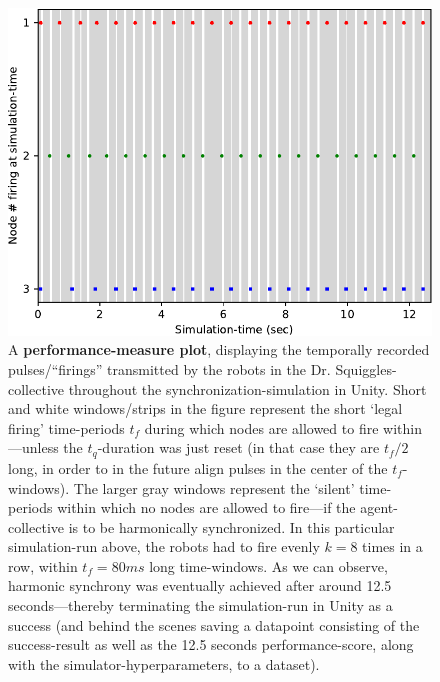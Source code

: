 \begin{figure}
	\centering
	\includegraphics[width=\linewidth]{Assets/Figures/Illustrations/IllustrativePerfMeasurePlot.pdf}
	\caption[A \textbf{performance-measure plot}.]{A \textbf{performance-measure plot}, displaying the temporally recorded pulses/``firings'' transmitted by the robots in the Dr. Squiggles-collective throughout the synchronization-simulation in Unity. Short and white windows/strips in the figure represent the short `legal firing' time-periods $t_f$ during which nodes are allowed to fire within—unless the $t_q$-duration was just reset (in that case they are $t_f/2$ long, in order to in the future align pulses in the center of the $t_f$-windows). The larger gray windows represent the `silent' time-periods within which no nodes are allowed to fire—if the agent-collective is to be harmonically synchronized. In this particular simulation-run above, the robots had to fire evenly $k=8$ times in a row, within $t_f=80ms$ long time-windows. As we can observe, harmonic synchrony was eventually achieved after around 12.5 seconds—thereby terminating the simulation-run in Unity as a success (and behind the scenes saving a datapoint consisting of the success-result as well as the 12.5 seconds performance-score, along with the simulator-hyperparameters, to a dataset).}
	\label{fig:perf_measure_plot}
\end{figure}

